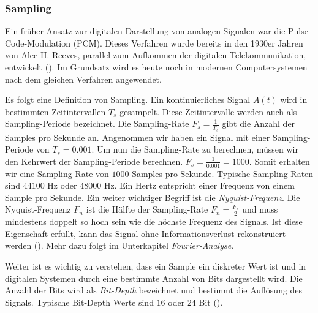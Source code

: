 \documentclass[11pt,a4paper]{article}
\begin{document}
\subsubsection{Sampling}
Ein früher Ansatz zur digitalen Darstellung von analogen Signalen war die Pulse-Code-Modulation
(PCM). Dieses Verfahren wurde bereits in den 1930er Jahren von Alec H. Reeves, parallel zum 
Aufkommen der digitalen Telekommunikation, entwickelt (\cite[p.~57]{deloraine1965pcm}). Im Grundsatz 
wird es heute noch in modernen Computersystemen nach dem gleichen Verfahren angewendet.

\noindent \newline
Es folgt eine Definition von Sampling. Ein kontinuierliches Signal \(A(t)\)
wird in bestimmten Zeitintervallen \(T_s\) gesampelt. Diese Zeitintervalle werden auch als
Sampling-Periode bezeichnet. Die Sampling-Rate \(F_s = \displaystyle\frac{1}{T_s}\) gibt die Anzahl
der Samples pro Sekunde an. Angenommen wir haben ein Signal mit einer Sampling-Periode
von \(T_s = 0.001\). Um nun die Sampling-Rate zu berechnen, müssen wir den Kehrwert der
Sampling-Periode berechnen. \(F_s = \displaystyle\frac{1}{0.001} = 1000\). Somit erhalten wir eine
Sampling-Rate von \(1000\) Samples pro Sekunde. Typische Sampling-Raten sind \(44100\) Hz
oder \(48000\) Hz. Ein Hertz entspricht einer Frequenz von einem Sample pro Sekunde. 
Ein weiter wichtiger Begriff ist die \textit{Nyquist-Frequenz}. Die Nyquist-Frequenz \(F_n\) ist 
die Hälfte der Sampling-Rate \(F_n = \displaystyle\frac{F_s}{2}\) und muss mindestens doppelt so 
hoch sein wie die höchste Frequenz des Signals. Ist diese Eigenschaft erfüllt, kann das 
Signal ohne Informationsverlust rekonstruiert werden (\cite[Chapter~3.1]{tarr2018hackaudio}). 
Mehr dazu folgt im Unterkapitel \textit{Fourier-Analyse}.

\noindent \newline
Weiter ist es wichtig zu verstehen, dass ein Sample ein diskreter Wert ist und in digitalen 
Systemen durch eine bestimmte Anzahl von Bits dargestellt wird. Die Anzahl der Bits wird
als \textit{Bit-Depth} bezeichnet und bestimmt die Auflösung des Signals. Typische
Bit-Depth Werte sind \(16\) oder \(24\) Bit (\cite[p.10]{somberg2019audioapi}).
\end{document}
